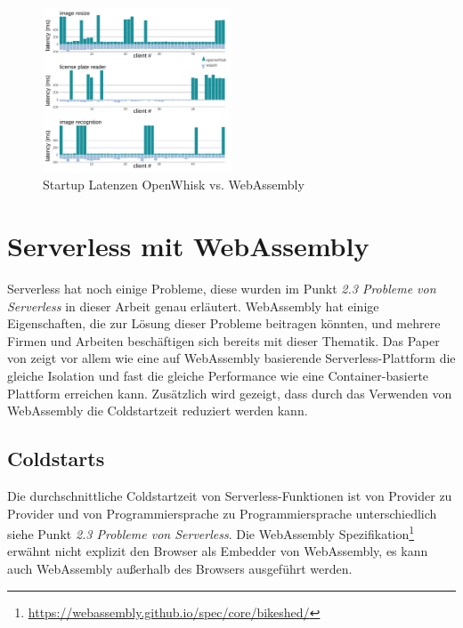 \begin{figure}[t]
	\centering
	\includegraphics[width=0.5\textwidth]{images/RequestTimesReal.png}
	\caption{
		Startup Latenzen OpenWhisk vs. WebAssembly \autocite[p.~233]{Hall2019}
	}
	\label{figure:StartupLatSecond}
\end{figure}

\section{Serverless mit WebAssembly}
\label{section:Serverless mit WebAssembly}

Serverless hat noch einige Probleme, diese wurden im Punkt \textit{2.3 Probleme von Serverless} in dieser Arbeit genau erläutert. WebAssembly hat einige Eigenschaften, die zur Lösung dieser Probleme beitragen könnten, und mehrere Firmen und Arbeiten beschäftigen sich bereits mit dieser Thematik. Das Paper von \cite{Hall2019} zeigt vor allem wie eine auf WebAssembly basierende Serverless-Plattform die gleiche Isolation und fast die gleiche Performance wie eine Container-basierte Plattform erreichen kann. Zusätzlich wird gezeigt, dass durch das Verwenden von WebAssembly die Coldstartzeit reduziert werden kann. 

\subsection{Coldstarts}

Die durchschnittliche Coldstartzeit von Serverless-Funktionen ist von Provider zu Provider und von Programmiersprache zu Programmiersprache unterschiedlich siehe Punkt \textit{2.3 Probleme von Serverless}. Die WebAssembly Spezifikation\footnote{\url{https://webassembly.github.io/spec/core/bikeshed/}} erwähnt nicht explizit den Browser als Embedder von WebAssembly, es kann auch WebAssembly außerhalb des Browsers ausgeführt werden.

